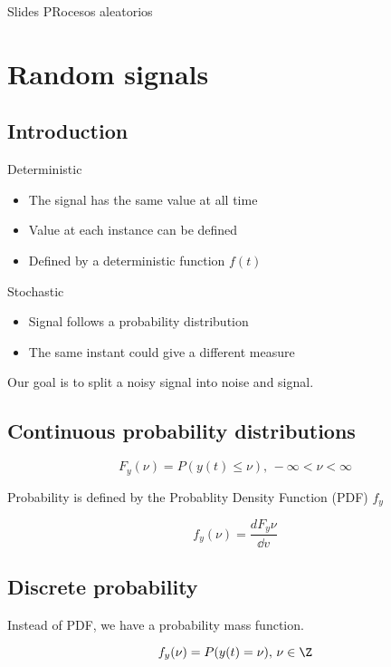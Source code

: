 \documentclass[../main/main.tex]{subfiles}
\begin{document}
Slides PRocesos aleatorios
\chapter{Random signals}

\section{Introduction}

Deterministic
\begin{itemize}
	\item The signal has the same value at all time
	\item Value at each instance can be defined
	\item Defined by a deterministic function $f(t)$
\end{itemize}

Stochastic
\begin{itemize}
	\item Signal follows a probability distribution
	\item The same instant could give a different measure
\end{itemize}


Our goal is to split a noisy signal into noise and signal.

\section{Continuous probability distributions}

\begin{equation}
	F_y (\nu) = P(y(t) \leq \nu),\, -\infty< \nu < \infty
\end{equation}

Probability is defined by the Probablity Density Function (PDF)  $f_y$

\begin{equation}
	f_y(\nu) = \frac{d F_y \nu}{\dd v}
\end{equation}

\section{Discrete probability }

Instead of PDF, we have a probability mass function.

\begin{equation}
	f_y(\nu) = P(y(t) = \nu),\,\nu \in \Z
\end{equation}
\end{document}
